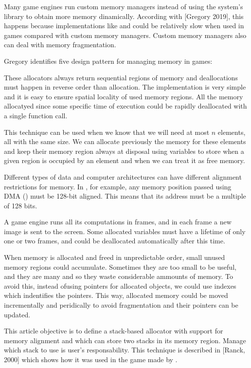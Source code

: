 Many game engines run custom memory managers instead of using the
system's library to obtain more memory dinamically. According with
[Gregory 2019], this happens because implementations
like  and  could be relatively slow when
used in games compared with custom memory managers. Custom memory
managers also can deal with memory fragmentation.

Gregory identifies five design pattern for managing memory in games:

 These allocators always return sequential
regions of memory and deallocations must happen in reverse order than
allocation. The implementation is very simple and it is easy to ensure
spatial locality of used memory regions. All the memory allocatyed
since some specific time of execution could be rapidly deallocated
with a single function call.

 This technique can be used when we know that we
will need at most $n$ elements, all with the same size. We can
allocate previously the memory for these elements and keep their
memory region always at disposal using variables to store when a given
region is occupied by an element and when we can treat it as free
memory.

 Different types of data and computer architectures
can have different alignment restrictions for
memory. In , for example, any memory position
passed using DMA () must be 128-bit
aligned. This means that its address must be a multiple of 128 bits.

 A game engine
runs all its computations in frames, and in each frame a new image is
sent to the screen. Some allocated variables must have a lifetime of
only one or two frames, and could be deallocated automatically after
this time.

 When memory is allocated and freed
in unpredictable order, small unused memory regions could
accumulate. Sometimes they are too small to be useful, and they are
many and so they waste considerable ammounts of memory. To avoid this,
instead ofusing pointers for allocated objects, we could use indexes
which indentifies the pointers. This way, allocated memory could be
moved incrementally and peridically to avoid fragmentation and their
pointers can be updated.

This article objective is to define a stack-based allocator with
support for memory alignment and which can store two stacks in its
memory region. Manage which stack to use is user's
responsability. This technique is described in [Ranck, 2000] which
shows how it was used in the game  made
by .


